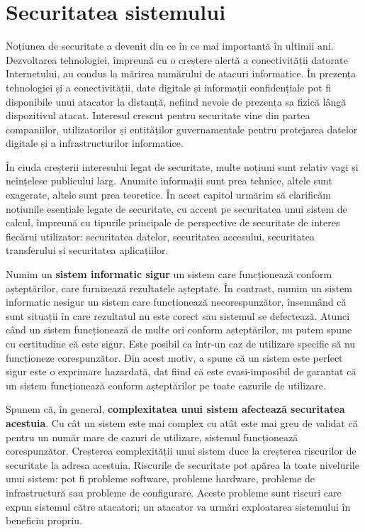 \chapter{Securitatea sistemului}
\label{chapter:sec}

Noțiunea de securitate a devenit din ce în ce mai importantă în ultimii ani. Dezvoltarea tehnologiei, împreună cu o creștere alertă a conectivității datorate Internetului, au condus la mărirea numărului de atacuri informatice. În prezența tehnologiei și a conectivității, date digitale și informații confidențiale pot fi disponibile unui atacator la distanță, nefiind nevoie de prezența sa fizică lângă dispozitivul atacat. Interesul crescut pentru securitate vine din partea companiilor, utilizatorilor și entităților guvernamentale pentru protejarea datelor digitale și a infrastructurilor informatice.

În ciuda creșterii interesului legat de securitate, multe noțiuni sunt relativ vagi și neînțelese publicului larg. Anumite informații sunt prea tehnice, altele sunt exagerate, altele sunt prea teoretice. În acest capitol urmărim să clarificăm noțiunile esențiale legate de securitate, cu accent pe securitatea unui sistem de calcul, împreună cu tipurile principale de perspective de securitate de interes fiecărui utilizator: securitatea datelor, securitatea accesului, securitatea transferului și securitatea aplicațiilor.

Numim un \textbf{sistem informatic sigur} un sistem care funcționează conform așteptărilor, care furnizează rezultatele așteptate. În contrast, numim un sistem informatic nesigur un sistem care funcționează necorespunzător, însemnând că sunt situații în care rezultatul nu este corect sau sistemul se defectează. Atunci când un sistem funcționează de multe ori conform așteptărilor, nu putem spune cu certitudine că este sigur. Este posibil ca într-un caz de utilizare specific să nu funcționeze corespunzător. Din acest motiv, a spune că un sistem este perfect sigur este o exprimare hazardată, dat fiind că este cvasi-imposibil de garantat că un sistem funcționează conform așteptărilor pe toate cazurile de utilizare.

Spunem că, în general, \textbf{complexitatea unui sistem afectează securitatea acestuia}. Cu cât un sistem este mai complex cu atât este mai greu de validat că pentru un număr mare de cazuri de utilizare, sistemul funcționează corespunzător. Creșterea complexității unui sistem duce la creșterea riscurilor de securitate la adresa acestuia. Riscurile de securitate pot apărea la toate nivelurile unui sistem: pot fi probleme software, probleme hardware, probleme de infrastructură sau probleme de configurare. Aceste probleme sunt riscuri care expun sistemul către atacatori; un atacator va urmări exploatarea sistemului în beneficiu propriu.

